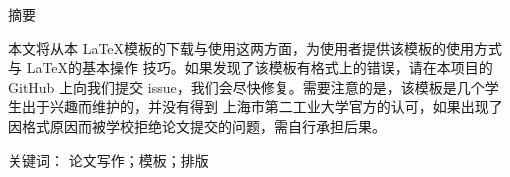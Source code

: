 \begin{center}
  \sffamily{}
  \abstractTitleCN
\end{center}

\begin{center}
  \heiti{}
  摘要
\end{center}


本文将从本 \LaTeX 模板的下载与使用这两方面，为使用者提供该模板的使用方式与 \LaTeX 的基本操作
技巧。如果发现了该模板有格式上的错误，请在本项目的 {\ttfamily GitHub} 上向我们提交
{\ttfamily issue}，我们会尽快修复。需要注意的是，该模板是几个学生出于兴趣而维护的，并没有得到
上海市第二工业大学官方的认可，如果出现了因格式原因而被学校拒绝论文提交的问题，需自行承担后果。

{\noindent\heiti 关键词：}
论文写作；模板；排版

\newpage

